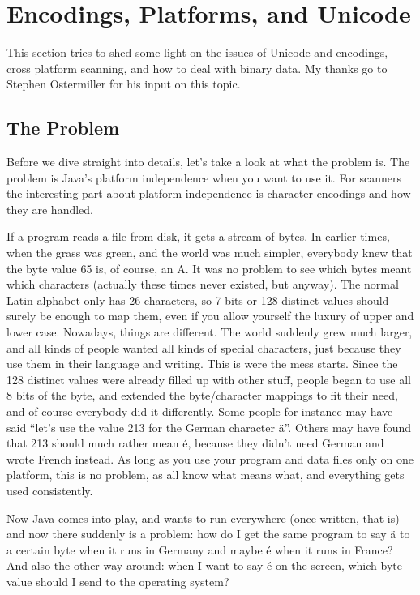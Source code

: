 \documentclass[11pt]{scrartcl}
\begin{document}
\section{Encodings, Platforms, and Unicode}\label{sec:encodings}

This section tries to shed some light on the issues of Unicode and
encodings, cross platform scanning, and how to deal with binary data.
My thanks go to Stephen Ostermiller for his input on this topic.

\subsection{The Problem}\label{sec:howtoencoding}

Before we dive straight into details, let's take a look at what the
problem is. The problem is Java's platform independence when you want
to use it. For scanners the interesting part about platform
independence is character encodings and how they are handled.

If a program reads a file from disk, it gets a stream of bytes.  In
earlier times, when the grass was green, and the world was much
simpler, everybody knew that the byte value 65 is, of course, an A.
It was no problem to see which bytes meant which characters (actually
these times never existed, but anyway).  The normal Latin alphabet
only has 26 characters, so 7 bits or 128 distinct values should surely
be enough to map them, even if you allow yourself the luxury of upper
and lower case.  Nowadays, things are different. The world suddenly
grew much larger, and all kinds of people wanted all kinds of special
characters, just because they use them in their language and writing.
This is were the mess starts. Since the 128 distinct values were
already filled up with other stuff, people began to use all 8 bits of
the byte, and extended the byte/character mappings to fit their need,
and of course everybody did it differently. Some people for instance
may have said ``let's use the value 213 for the German character {\"a}''.  Others
may have found that 213 should much rather mean {\'e}, because they didn't need
German and wrote French instead. As long as you use your program and
data files only on one platform, this is no problem, as all know what
means what, and everything gets used consistently.

Now Java comes into play, and wants to run everywhere (once written,
that is) and now there suddenly is a problem: how do I get the same
program to say {\"a} to a certain byte when it runs in Germany and maybe {\'e}
when it runs in France? And also the other way around: when I want to
say {\'e} on the screen, which byte value should I send to the operating
system?
\end{document}
